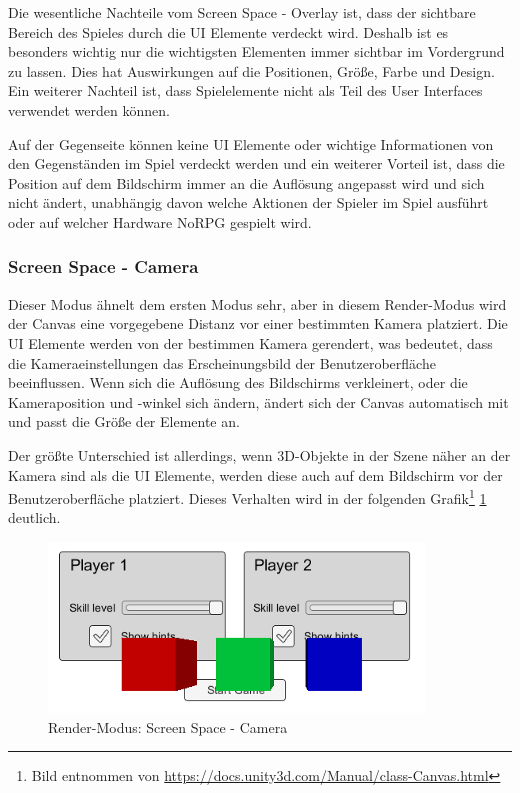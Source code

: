 			Die wesentliche Nachteile vom Screen Space - Overlay ist, dass der sichtbare Bereich des Spieles durch die UI Elemente verdeckt wird. Deshalb ist es besonders wichtig nur die wichtigsten Elementen immer sichtbar im Vordergrund zu lassen. Dies hat Auswirkungen auf die Positionen, Größe, Farbe und Design. Ein weiterer Nachteil ist, dass Spielelemente nicht als Teil des User Interfaces verwendet werden können. 

			Auf der Gegenseite können keine UI Elemente oder wichtige Informationen von den Gegenständen im Spiel verdeckt werden und ein weiterer Vorteil ist, dass die Position auf dem Bildschirm immer an die Auflösung angepasst wird und sich nicht ändert, unabhängig davon welche Aktionen der Spieler im Spiel ausführt oder auf welcher Hardware NoRPG gespielt wird.

		\subsubsection{Screen Space - Camera}
			Dieser Modus ähnelt dem ersten Modus sehr, aber in diesem Render-Modus wird der Canvas eine vorgegebene Distanz vor einer bestimmten Kamera platziert. Die UI Elemente werden von der bestimmen Kamera gerendert, was bedeutet, dass die Kameraeinstellungen das Erscheinungsbild der Benutzeroberfläche beeinflussen. Wenn sich die Auflösung des Bildschirms verkleinert, oder die Kameraposition und -winkel sich ändern, ändert sich der Canvas automatisch mit und passt die Größe der Elemente an.

			Der größte Unterschied ist allerdings, wenn 3D-Objekte in der Szene näher an der Kamera sind als die UI Elemente, werden diese auch auf dem Bildschirm vor der Benutzeroberfläche platziert. Dieses Verhalten wird in der folgenden Grafik\footnote{Bild entnommen von \url{https://docs.unity3d.com/Manual/class-Canvas.html}} \ref{renderCamera} deutlich.

			\begin{figure}[htbp]
				\centering 
				\label{renderCamera}
				\includegraphics[width=10cm]{pics/CanvasCamera.png}
				\caption{Render-Modus: Screen Space - Camera}
			\end{figure}

